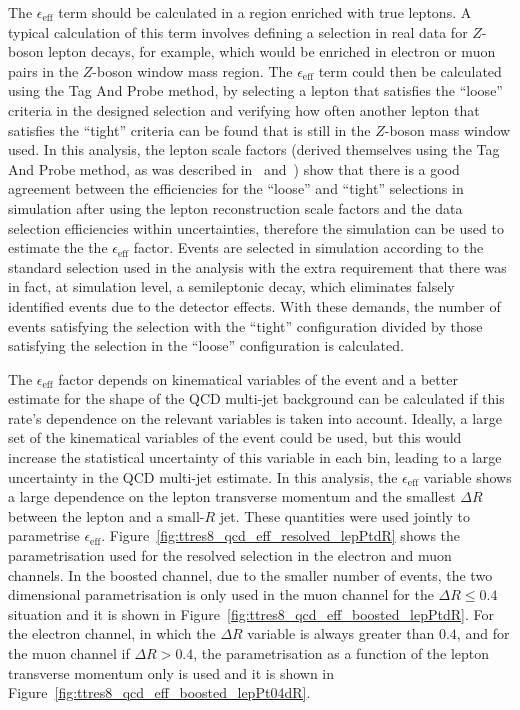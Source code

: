 The $\epsilon_{\mathrm{eff}}$ term should be calculated in a region enriched with true leptons. A typical calculation of this term involves defining a selection
in real data for $Z$-boson lepton decays, for example, which would be enriched in electron or muon pairs in the $Z$-boson window mass region.
The $\epsilon_{\mathrm{eff}}$ term could then be calculated using the Tag And Probe method,
by selecting a lepton that satisfies the ``loose'' criteria in the designed selection and verifying how often another lepton that satisfies the ``tight'' criteria
can be found that is still in the $Z$-boson mass window used. In this analysis, the lepton scale factors (derived themselves using the Tag And Probe method, as
was described in~\cite{electron2010} and~\cite{muonperf2010}) show that there is a good agreement between the
efficiencies for the ``loose'' and ``tight'' selections in simulation after using the lepton reconstruction scale factors
and the data selection efficiencies within uncertainties, therefore the simulation can be used to estimate
the the $\epsilon_{\mathrm{eff}}$ factor.
Events are selected in \ttbar simulation according to the standard selection used in the analysis with the extra requirement
that there was in fact, at simulation level, a semileptonic \ttbar decay, which eliminates falsely identified events due to the detector effects. With these demands,
the number of events satisfying the selection with the ``tight'' configuration divided by those satisfying the selection in the ``loose'' configuration is calculated.

The $\epsilon_{\mathrm{eff}}$ factor depends on kinematical variables of the event and a better estimate
for the shape of the QCD multi-jet background can be calculated if this rate's dependence on the relevant variables is taken into account. Ideally, a large set
of the kinematical variables of the event could be used, but this would increase the statistical uncertainty of this variable in each bin, leading to a large uncertainty
in the QCD multi-jet estimate. In this analysis, the $\epsilon_{\mathrm{eff}}$ variable shows a large dependence on the lepton transverse momentum and the smallest $\Delta R$ between the lepton and a small-$R$ jet. These quantities were used jointly to parametrise $\epsilon_{\mathrm{eff}}$.
Figure~\ref{fig:ttres8_qcd_eff_resolved_lepPtdR} shows the
parametrisation used for the resolved selection in the electron and muon channels. In the boosted channel, due to the smaller number of events, the two dimensional
parametrisation is only used in the muon channel for the $\Delta R \leq 0.4$ situation and it is shown in Figure~\ref{fig:ttres8_qcd_eff_boosted_lepPtdR}. For the electron
channel, in which the $\Delta R$ variable is always greater than $0.4$, and for the muon channel if $\Delta R > 0.4$, the parametrisation as a function of the lepton
transverse momentum only is used and it is shown in Figure~\ref{fig:ttres8_qcd_eff_boosted_lepPt04dR}.

